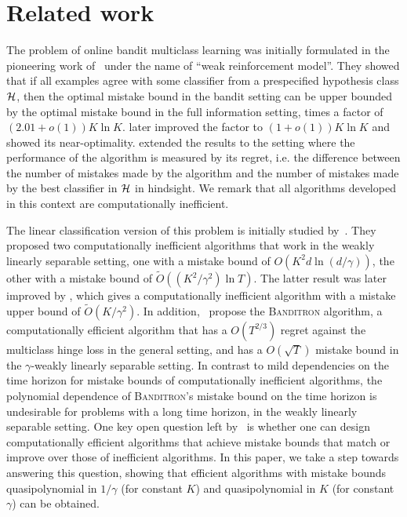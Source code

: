 \section{Related work}
\label{section:related-work}

The problem of online bandit multiclass learning was initially formulated in the
pioneering work of~\citet{Auer-Long-1999} under the name of ``weak reinforcement
model''. They showed that if all examples agree with some classifier from a
prespecified hypothesis class $\mathcal{H}$, then the optimal mistake bound in the
bandit setting can be upper bounded by the optimal mistake bound in the full
information setting, times a factor of $(2.01 + o(1))K \ln K$. \citet{Long-2017}
later improved the factor to $(1 + o(1)) K \ln K$ and showed its
near-optimality. \citet{Daniely-Helbertal-2013} extended the results to the
setting where the performance of the algorithm is measured by its regret, i.e.
the difference between the number of mistakes made by the algorithm and the
number of mistakes made by the best classifier in $\mathcal{H}$ in hindsight. We
remark that all algorithms developed in this context are computationally
inefficient.

The linear classification version of this problem is initially studied
by~\citet{Kakade-Shalev-Shwartz-Tewari-2008}. They proposed two computationally
inefficient algorithms that work in the weakly linearly separable setting, one
with a mistake bound of $O(K^2 d \ln(d/\gamma))$, the other with a mistake bound
of $\widetilde{O}((K^2/\gamma^2) \ln T)$. The latter result was later improved
by \citet{Daniely-Helbertal-2013}, which gives a computationally inefficient
algorithm with a mistake upper bound of $\widetilde{O}(K/\gamma^2)$. In
addition,~\citet{Kakade-Shalev-Shwartz-Tewari-2008} propose the
\textsc{Banditron} algorithm, a computationally efficient algorithm that has a
$O(T^{2/3})$ regret against the multiclass hinge loss in the general setting,
and has a $O(\sqrt{T})$ mistake bound in the $\gamma$-weakly linearly separable
setting. In contrast to mild dependencies on the time horizon for mistake bounds
of computationally inefficient algorithms, the polynomial dependence of
\textsc{Banditron}'s mistake bound on the time horizon is undesirable for
problems with a long time horizon, in the weakly linearly separable setting. One
key open question left by~\citet{Kakade-Shalev-Shwartz-Tewari-2008} is whether
one can design computationally efficient algorithms that achieve mistake bounds
that match or improve over those of inefficient algorithms. In this paper, we
take a step towards answering this question, showing that efficient algorithms
with mistake bounds quasipolynomial in $1/\gamma$ (for constant $K$) and
quasipolynomial in $K$ (for constant $\gamma$) can be obtained.

